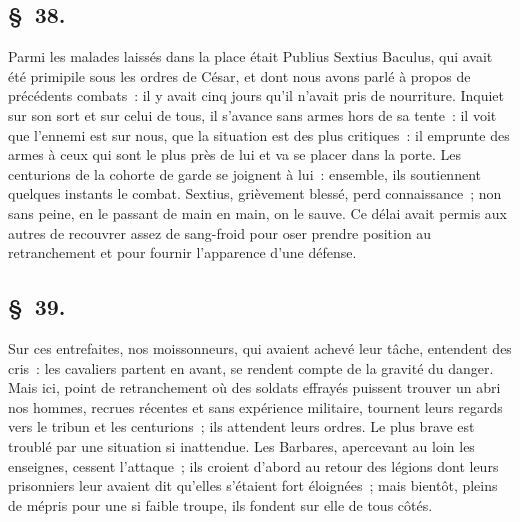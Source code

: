 \documentclass[french,twoside]{book} %
\begin{document}
\subsection[{§ 38.}]{ \textsc{§ 38.} }
\noindent Parmi les malades laissés dans la place était Publius Sextius Baculus, qui avait été primipile sous les ordres de César, et dont nous avons parlé à propos de précédents combats : il y avait cinq jours qu’il n’avait pris de nourriture. Inquiet sur son sort et sur celui de tous, il s’avance sans armes hors de sa tente : il voit que l’ennemi est sur nous, que la situation est des plus critiques : il emprunte des armes à ceux qui sont le plus près de lui et va se placer dans la porte. Les centurions de la cohorte de garde se joignent à lui : ensemble, ils soutiennent quelques instants le combat. Sextius, grièvement blessé, perd connaissance ; non sans peine, en le passant de main en main, on le sauve. Ce délai avait permis aux autres de recouvrer assez de sang-froid pour oser prendre position au retranchement et pour fournir l’apparence d’une défense.
\subsection[{§ 39.}]{ \textsc{§ 39.} }
\noindent Sur ces entrefaites, nos moissonneurs, qui avaient achevé leur tâche, entendent des cris : les cavaliers partent en avant, se rendent compte de la gravité du danger. Mais ici, point de retranchement où des soldats effrayés puissent trouver un abri nos hommes, recrues récentes et sans expérience militaire, tournent leurs regards vers le tribun et les centurions ; ils attendent leurs ordres. Le plus brave est troublé par une situation si inattendue. Les Barbares, apercevant au loin les enseignes, cessent l’attaque ; ils croient d’abord au retour des légions dont leurs prisonniers leur avaient dit qu’elles s’étaient fort éloignées ; mais bientôt, pleins de mépris pour une si faible troupe, ils fondent sur elle de tous côtés.
\end{document}
